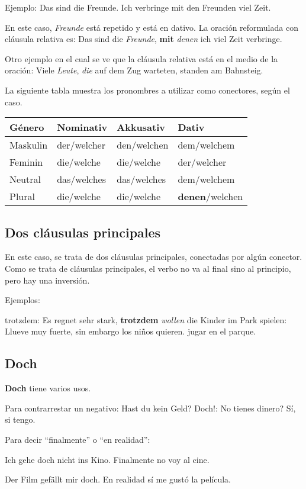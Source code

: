 Ejemplo: Das sind die Freunde. Ich verbringe mit den Freunden viel Zeit. 

En este caso, \textit{Freunde} está repetido y está en dativo. La oración reformulada con cláusula relativa es: Das sind die \textit{Freunde}, \textbf{mit} \textit{denen} ich viel Zeit verbringe.

Otro ejemplo en el cual se ve que la cláusula relativa está en el medio de la oración: Viele \textit{Leute}, \textit{die} auf dem Zug warteten, standen am Bahnsteig.


La siguiente tabla muestra los pronombres a utilizar como conectores, según el caso.

\begin{tabular}{| l | l | l | l |}
\hline
\textbf{Género} & \textbf{Nominativ} & \textbf{Akkusativ} & \textbf{Dativ}\\
\hline
Maskulin & der/welcher & den/welchen & dem/welchem  \\
Feminin  & die/welche  & die/welche  & der/welcher \\
Neutral  & das/welches & das/welches & dem/welchem \\
Plural   & die/welche  & die/welche  & \textbf{denen}/welchen \\
\hline
\end{tabular}

\subsection{Dos cláusulas principales}
En este caso, se trata de dos cláusulas principales, conectadas por algún conector. Como se trata de cláusulas principales, el verbo no va al final sino al principio, pero hay una inversión.

Ejemplos:
\begin{myitemize}
\item trotzdem: Es regnet sehr stark, \textbf{trotzdem} \textit{wollen} die Kinder im Park spielen: Llueve muy fuerte, sin embargo los niños quieren. jugar en el parque.
\end{myitemize}

\subsection{Doch}
\textbf{Doch} tiene varios usos.

Para contrarrestar un negativo:
Hast du kein Geld? Doch!: No tienes dinero? Sí, si tengo.

Para decir ``finalmente'' o ``en realidad'':
\begin{myitemize}
\item Ich gehe doch nicht ins Kino. Finalmente no voy al cine.
\item Der Film gefällt mir doch. En realidad sí me gustó la película.
\end{myitemize}

